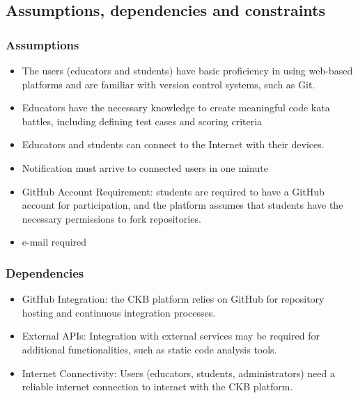 \subsection {Assumptions, dependencies and constraints}

\subsubsection{Assumptions}
\begin{itemize}
    \item The users (educators and students) have basic proficiency in using web-based platforms and are familiar with version control systems, such as Git.
    \item Educators have the necessary knowledge to create meaningful code kata battles, including defining test cases and scoring criteria
    \item Educators and students can connect to the Internet with their devices.
    \item Notification must arrive to connected users in one minute
    \item GitHub Account Requirement: students are required to have a GitHub account for participation, and the platform assumes that students have the necessary permissions to fork repositories.
    \item e-mail required
\end{itemize}

\subsubsection{Dependencies}
\begin{itemize}
    \item GitHub Integration: the CKB platform relies on GitHub for repository hosting and continuous integration processes.
    \item External APIs: Integration with external services may be required for additional functionalities, such as static code analysis tools.
    \item Internet Connectivity: Users (educators, students, administrators) need a reliable internet connection to interact with the CKB platform.
\end{itemize}

